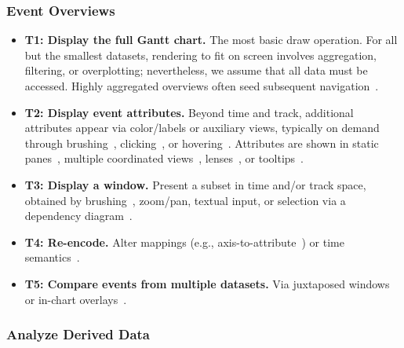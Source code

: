 \begin{refsection}
\subsubsection{Event Overviews}

\begin{itemize}\itemsep0.25ex
\item \textbf{T1: Display the full Gantt chart.} The most basic draw operation. For all but the smallest datasets, rendering to fit on screen involves aggregation, filtering, or overplotting; nevertheless, we assume that all data must be accessed. Highly aggregated overviews often seed subsequent navigation~\cite{nagel1996vampir, zaki1999toward, pinto2016analyzing, kaldor2017canopy}. 

\item \textbf{T2: Display event attributes.} Beyond time and track, additional attributes appear via color/labels or auxiliary views, typically on demand through brushing~\cite{andre2007continuum, meyer2016visual}, clicking~\cite{pillet1995paraver}, or hovering~\cite{de2010zinsight}. Attributes are shown in static panes~\cite{meyer2016visual, sakin2022traveler, kaldor2017canopy}, multiple coordinated views~\cite{nagel1996vampir,de2010zinsight,sakin2022traveler}, lenses~\cite{nagel1996vampir, luz2010improving, jo2014livegantt}, or tooltips~\cite{de2010zinsight, jo2014livegantt, antweiler2022uncovering}.

\item \textbf{T3: Display a window.} Present a subset in time and/or track space, obtained by brushing~\cite{adhianto2010hpctoolkit, sakin2022traveler}, zoom/pan, textual input, or selection via a dependency diagram~\cite{de2010zinsight}. 

\item \textbf{T4: Re-encode.} Alter mappings (e.g., axis-to-attribute~\cite{pillet1995paraver, gupta2016movementslicer}) or time semantics~\cite{isaacs2014combing, jo2014livegantt, zaki1999toward}.

\item \textbf{T5: Compare events from multiple datasets.} Via juxtaposed windows~\cite{sakin2022traveler, kaldor2017canopy} or in-chart overlays~\cite{bell2003paraprof}. 
\end{itemize}

\subsubsection{Analyze Derived Data}


\end{refsection}
